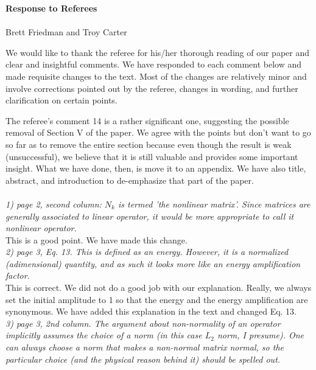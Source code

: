 \documentclass[12pt]{article}
\begin{document}
{\bf Response to Referees \\
 \\} 
Brett Friedman and Troy Carter

\hrulefill

We would like to thank the referee for his/her thorough reading of our paper and clear and insightful comments. We have responded to each comment below and made requisite changes to the text.
Most of the changes are relatively minor and involve corrections pointed out by the referee, changes in wording, and further clarification on certain points.

The referee's comment 14 is a rather significant one, suggesting the possible removal of Section V of the paper. 
We agree with the points but don't want to go so far as to remove the entire section because even though the result is weak (unsuccessful), 
we believe that it is still valuable and provides some important insight. What we have done, then, is move it to an appendix. 
We have also title, abstract, and introduction to de-emphasize that part of the paper. \\ \\


\emph{1) page 2, second column: $N_k$ is termed 'the nonlinear matrix'. Since matrices are generally associated to linear operator, it would be more appropriate to call it nonlinear operator. } \\

This is a good point. We have made this change. \\

\emph{2) page 3, Eq. 13. This is defined as an energy. However, it is a normalized (adimensional) quantity, and as such it looks more like an energy amplification factor.}\\

This is correct. We did not do a good job with our explanation. Really, we always set the initial amplitude to 1 so that the energy and the energy amplification are synonymous.
We have added this explanation in the text and changed Eq. 13. \\


\emph{3) page 3, 2nd column. The argument about non-normality of an operator implicitly assumes the choice of a norm (in this case $L_2$ norm, I presume). One can always choose a norm that makes a non-normal matrix normal, so the particular choice (and the physical reason behind it) should be spelled out. }\\
\end{document}
